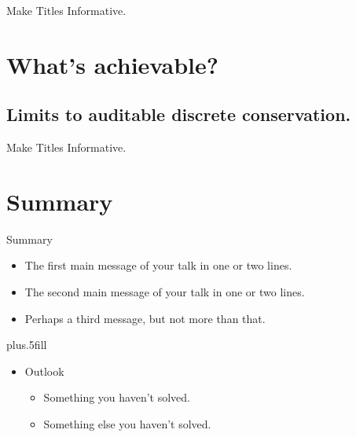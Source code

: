 \documentclass{beamer}
\begin{document}
\begin{frame}{Make Titles Informative.}
\end{frame}


\section{What's achievable?}

\subsection{Limits to auditable discrete conservation.}

\begin{frame}{Make Titles Informative.}
\end{frame}


\section*{Summary}

\begin{frame}{Summary}

  \begin{itemize}
  \item
    The \alert{first main message} of your talk in one or two lines.
  \item
    The \alert{second main message} of your talk in one or two lines.
  \item
    Perhaps a \alert{third message}, but not more than that.
  \end{itemize}
  
  \vskip0pt plus.5fill
  \begin{itemize}
  \item
    Outlook
    \begin{itemize}
    \item
      Something you haven't solved.
    \item
      Something else you haven't solved.
    \end{itemize}
  \end{itemize}
\end{frame}
\end{document}
